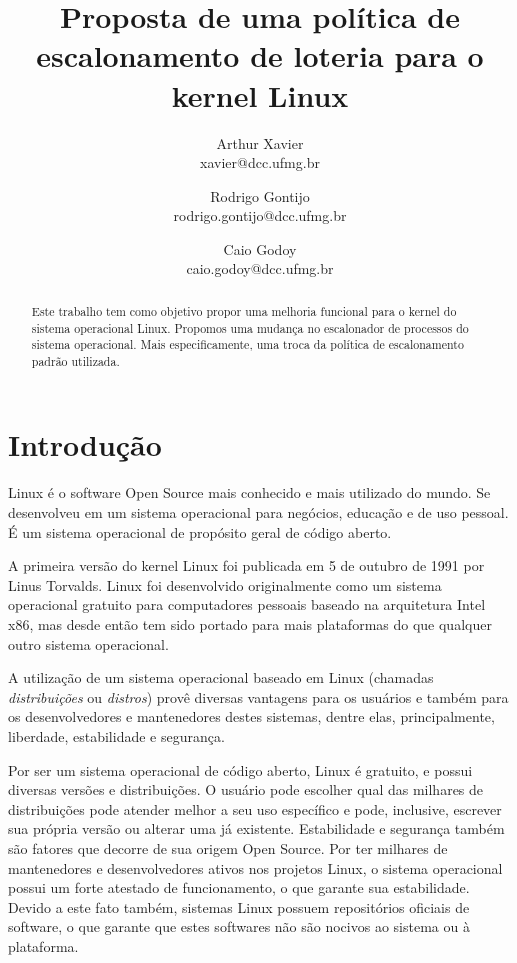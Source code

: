 \documentclass[a4paper,12pt]{article}
\title{Proposta de uma política de escalonamento de loteria para o kernel Linux}
\author{
    Arthur Xavier\\
    \small{xavier@dcc.ufmg.br}
    \and
    Rodrigo Gontijo\\
    \small{rodrigo.gontijo@dcc.ufmg.br}
    \and
    Caio Godoy\\
    \small{caio.godoy@dcc.ufmg.br}
}
\begin{document}
\maketitle

\begin{abstract}
  Este trabalho tem como objetivo propor uma melhoria funcional para o kernel do sistema operacional Linux. Propomos uma mudança no escalonador de processos do sistema operacional. Mais especificamente, uma troca da política de escalonamento padrão utilizada.
\end{abstract}

\section{Introdução}
Linux é o software Open Source mais conhecido e mais utilizado do mundo. Se desenvolveu em um sistema operacional para negócios, educação e de uso pessoal. É um sistema operacional de propósito geral de código aberto. \cite{Welsh1998}

A primeira versão do kernel Linux foi publicada em 5 de outubro de 1991 por Linus Torvalds. Linux foi desenvolvido originalmente como um sistema operacional gratuito para computadores pessoais baseado na arquitetura Intel x86, mas desde então tem sido portado para mais plataformas do que qualquer outro sistema operacional. \cite{LinuxWikipedia2016}

A utilização de um sistema operacional baseado em Linux (chamadas \emph{distribuições} ou \emph{distros}) provê diversas vantagens para os usuários e também para os desenvolvedores e mantenedores destes sistemas, dentre elas, principalmente, liberdade, estabilidade e segurança.

Por ser um sistema operacional de código aberto, Linux é gratuito, e possui diversas versões e distribuições. O usuário pode escolher qual das milhares de distribuições pode atender melhor a seu uso específico e pode, inclusive, escrever sua própria versão ou alterar uma já existente. Estabilidade e segurança também são fatores que decorre de sua origem Open Source. Por ter milhares de mantenedores e desenvolvedores ativos nos projetos Linux, o sistema operacional possui um forte atestado de funcionamento, o que garante sua estabilidade. Devido a este fato também, sistemas Linux possuem repositórios oficiais de software, o que garante que estes softwares não são nocivos ao sistema ou à plataforma.
\end{document}
